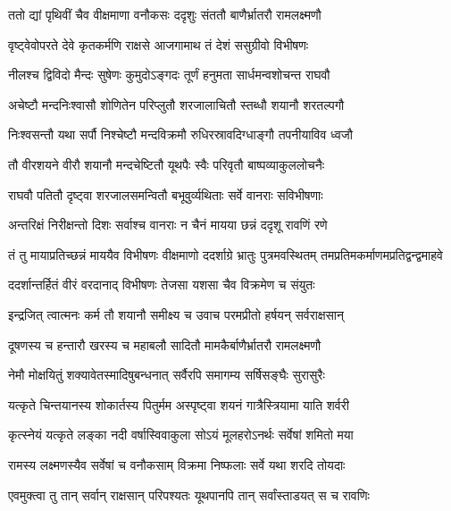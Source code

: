 
\twolineshloka
{ततो द्यां पृथिवीं चैव वीक्षमाणा वनौकसः}
{ददृशुः संततौ बाणैर्भ्रातरौ रामलक्ष्मणौ} %

\twolineshloka
{वृष्ट्वेवोपरते देवे कृतकर्मणि राक्षसे}
{आजगामाथ तं देशं ससुग्रीवो विभीषणः} %

\twolineshloka
{नीलश्च द्विविदो मैन्दः सुषेणः कुमुदोऽङ्गदः}
{तूर्णं हनुमता सार्धमन्वशोचन्त राघवौ} %

\twolineshloka
{अचेष्टौ मन्दनिःश्वासौ शोणितेन परिप्लुतौ}
{शरजालाचितौ स्तब्धौ शयानौ शरतल्पगौ} %

\twolineshloka
{निःश्वसन्तौ यथा सर्पौ निश्चेष्टौ मन्दविक्रमौ}
{रुधिरस्रावदिग्धाङ्गौ तपनीयाविव ध्वजौ} %

\twolineshloka
{तौ वीरशयने वीरौ शयानौ मन्दचेष्टितौ}
{यूथपैः स्वैः परिवृतौ बाष्पव्याकुललोचनैः} %

\twolineshloka
{राघवौ पतितौ दृष्ट्वा शरजालसमन्वितौ}
{बभूवुर्व्यथिताः सर्वे वानराः सविभीषणाः} %

\twolineshloka
{अन्तरिक्षं निरीक्षन्तो दिशः सर्वाश्च वानराः}
{न चैनं मायया छन्नं ददृशू रावणिं रणे} %

\threelineshloka
{तं तु मायाप्रतिच्छन्नं माययैव विभीषणः}
{वीक्षमाणो ददर्शाग्रे भ्रातुः पुत्रमवस्थितम्}
{तमप्रतिमकर्माणमप्रतिद्वन्द्वमाहवे} %

\twolineshloka
{ददर्शान्तर्हितं वीरं वरदानाद् विभीषणः}
{तेजसा यशसा चैव विक्रमेण च संयुतः} %

\twolineshloka
{इन्द्रजित् त्वात्मनः कर्म तौ शयानौ समीक्ष्य च}
{उवाच परमप्रीतो हर्षयन् सर्वराक्षसान्} %

\twolineshloka
{दूषणस्य च हन्तारौ खरस्य च महाबलौ}
{सादितौ मामकैर्बाणैर्भ्रातरौ रामलक्ष्मणौ} %

\twolineshloka
{नेमौ मोक्षयितुं शक्यावेतस्मादिषुबन्धनात्}
{सर्वैरपि समागम्य सर्षिसङ्घैः सुरासुरैः} %

\twolineshloka
{यत्कृते चिन्तयानस्य शोकार्तस्य पितुर्मम}
{अस्पृष्ट्वा शयनं गात्रैस्त्रियामा याति शर्वरी} %

\twolineshloka
{कृत्स्नेयं यत्कृते लङ्का नदी वर्षास्विवाकुला}
{सोऽयं मूलहरोऽनर्थः सर्वेषां शमितो मया} %

\twolineshloka
{रामस्य लक्ष्मणस्यैव सर्वेषां च वनौकसाम्}
{विक्रमा निष्फलाः सर्वे यथा शरदि तोयदाः} %

\twolineshloka
{एवमुक्त्वा तु तान् सर्वान् राक्षसान् परिपश्यतः}
{यूथपानपि तान् सर्वांस्ताडयत् स च रावणिः} %

